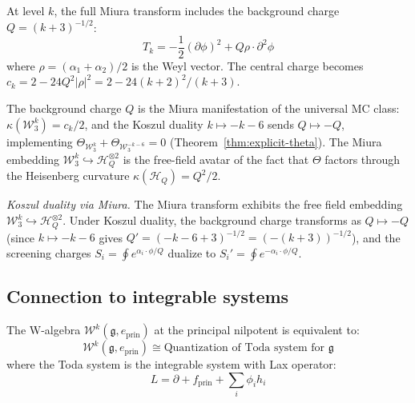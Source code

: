 \begin{computation}
At level $k$, the full Miura transform includes the background charge
$Q = (k+3)^{-1/2}$:
\begin{equation}
T_k = -\frac{1}{2}(\partial\phi)^2 + Q \rho \cdot \partial^2\phi
\end{equation}
where $\rho = (\alpha_1 + \alpha_2)/2$ is the Weyl vector.  The
central charge becomes $c_k = 2 - 24Q^2|\rho|^2 = 2 - 24(k+2)^2/(k+3)$.

The background charge $Q$ is the Miura manifestation of the
universal MC class: $\kappa(\mathcal{W}_3^k) = c_k/2$, and the
Koszul duality $k \mapsto -k-6$ sends $Q \mapsto -Q$, implementing
$\Theta_{\mathcal{W}_3^k} + \Theta_{\mathcal{W}_3^{-k-6}} = 0$
(Theorem~\ref{thm:explicit-theta}).  The Miura embedding
$\mathcal{W}_3^k \hookrightarrow \mathcal{H}^{\otimes 2}_Q$
is the free-field avatar of the fact that $\Theta$ factors
through the Heisenberg curvature $\kappa(\mathcal{H}_Q) = Q^2/2$.

\emph{Koszul duality via Miura.}
The Miura transform exhibits the free field embedding
$\mathcal{W}_3^k \hookrightarrow \mathcal{H}^{\otimes 2}_{Q}$.
Under Koszul duality, the background charge transforms as
$Q \mapsto -Q$ (since $k \mapsto -k-6$ gives
$Q' = (-k-6+3)^{-1/2} = (-(k+3))^{-1/2}$), and the screening
charges $S_i = \oint e^{\alpha_i \cdot \phi/Q}$ dualize to
$S_i' = \oint e^{-\alpha_i \cdot \phi/Q}$.
\end{computation}


\subsection{Connection to integrable systems}

\begin{theorem}\label{thm:w-toda}
The W-algebra $\mathcal{W}^k(\mathfrak{g}, e_{\mathrm{prin}})$ at the principal nilpotent is equivalent to:
\[
\mathcal{W}^k(\mathfrak{g}, e_{\mathrm{prin}}) \cong \text{Quantization of Toda system for } \mathfrak{g}
\]
where the Toda system is the integrable system with Lax operator:
\[
L = \partial + f_{\mathrm{prin}} + \sum_{i} \phi_i h_i
\]
\end{theorem}

